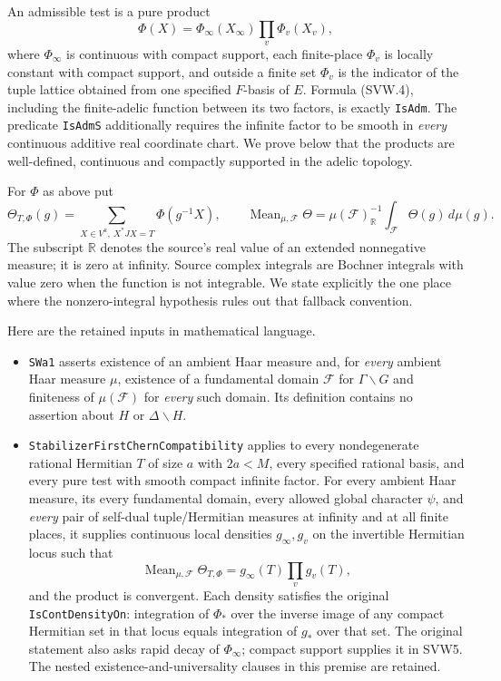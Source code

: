 An admissible test is a pure product
\[
 \Phi(X)=\Phi_\infty(X_\infty)\prod_v\Phi_v(X_v),
 \tag{SVW.4}
\]
where $\Phi_\infty$ is continuous with compact support, each finite-place
$\Phi_v$ is locally constant with compact support, and outside a finite
set $\Phi_v$ is the indicator of the tuple lattice obtained from one
specified $F$-basis of $E$.  Formula (SVW.4), including the finite-adelic
function between its two factors, is exactly \texttt{IsAdm}.  The
predicate \texttt{IsAdmS} additionally requires the infinite factor to
be smooth in \emph{every} continuous additive real coordinate chart.
We prove below that the products are well-defined, continuous and
compactly supported in the adelic topology.

For $\Phi$ as above put
\[
 \Theta_{T,\Phi}(g)=
  \sum_{X\in V^a,\ X^*JX=T}\Phi(g^{-1}X),\qquad
 \operatorname{Mean}_{\mu,\mathcal F}\Theta
   =\mu(\mathcal F)_{\mathbb R}^{-1}
                      \int_{\mathcal F}\Theta(g)\,d\mu(g).
 \tag{SVW.5}
\]
The subscript $\mathbb R$ denotes the source's real value of an
extended nonnegative measure; it is zero at infinity.  Source complex
integrals are Bochner integrals with value zero when the function is
not integrable.  We state explicitly the one place where the
nonzero-integral hypothesis rules out that fallback convention.

Here are the retained inputs in mathematical language.

\begin{itemize}
\item \texttt{SWa1} asserts existence of an ambient Haar measure and,
for \emph{every} ambient Haar measure $\mu$, existence of a fundamental
domain $\mathcal F$ for $\Gamma\backslash G$ and finiteness of
$\mu(\mathcal F)$ for \emph{every} such domain.  Its definition
contains no assertion about $H$ or $\Delta\backslash H$.
\item \texttt{StabilizerFirstChern}\allowbreak\texttt{Compatibility} applies to every
nondegenerate rational Hermitian $T$ of size $a$ with $2a<M$,
every specified rational basis, and every pure test with smooth compact
infinite factor.  For every ambient Haar measure, its every
fundamental domain, every allowed global character $\psi$, and
\emph{every} pair of self-dual tuple/Hermitian measures at infinity
and at all finite places, it supplies continuous local densities
$g_\infty,g_v$ on the invertible Hermitian locus such that
\[
 \operatorname{Mean}_{\mu,\mathcal F}\Theta_{T,\Phi}
       =g_\infty(T)\prod_v g_v(T),
 \tag{SVW.6}
\]
and the product is convergent.  Each density satisfies the original
\texttt{IsContDensityOn}: integration of $\Phi_*$ over the inverse
image of any compact Hermitian set in that locus equals integration
of $g_*$ over that set.  The original statement also asks rapid decay
of $\Phi_\infty$; compact support supplies it in SVW5.  The nested
existence-and-universality clauses in this premise are retained.
\end{itemize}

